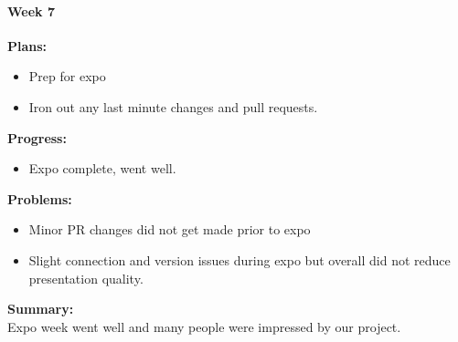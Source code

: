 \paragraph{Week 7}
\begin{adjustwidth}{2.5em}{0pt}
    \vspace{-0.5cm}\textbf{Plans:}
    \vspace{-0.5cm}
    \begin{itemize}
        \item Prep for expo
        \item Iron out any last minute changes and pull requests.
    \end{itemize} 
    \vspace{-0.3cm}\textbf{Progress:}
    \vspace{-0.5cm}
    \begin{itemize}
        \item Expo complete, went well.
    \end{itemize} 
    \vspace{-0.3cm}\textbf{Problems:}
    \vspace{-0.5cm}
    \begin{itemize}
        \item Minor PR changes did not get made prior to expo 
		\item Slight connection and version issues during expo but overall did not reduce presentation quality.
    \end{itemize}  
    \vspace{-0.3cm}\noindent\textbf{Summary:}\\
    \noindent Expo week went well and many people were impressed by our project.
\end{adjustwidth} 
